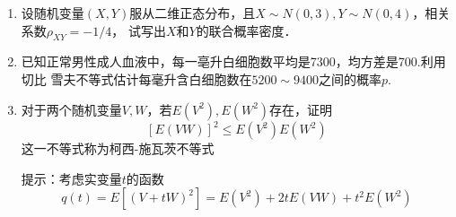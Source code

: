 \documentclass[10pt,a4paper]{article}
\begin{document}
\begin{enumerate}
    \item 设随机变量$(X,Y)$服从二维正态分布，且$X\sim N(0,3),Y\sim N(0,4)$，相关系数$\rho_{XY}=-1/4$，
    试写出$X$和$Y$的联合概率密度．
    
    
    \item 已知正常男性成人血液中，每一亳升白细胞数平均是7300，均方差是700.利用切比
    雪夫不等式估计每毫升含白细胞数在$5200\sim 9400$之间的概率$p$.
    
    
    \item 对于两个随机变量$V,W$，若$E(V^2),E(W^2)$存在，证明
    $$[E(VW)]^2\leq E(V^2)E(W^2)$$
    这一不等式称为柯西-施瓦茨不等式
    \par 提示：考虑实变量$t$的函数
    $$q(t)=E[(V+tW)^2]=E(V^2)+2tE(VW)+t^2E(W^2)$$




  

\end{enumerate}
\end{document}
